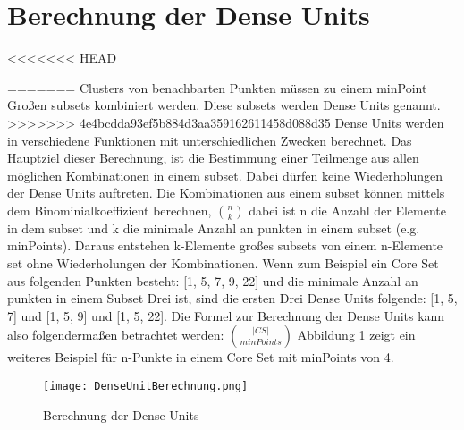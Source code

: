\section{Berechnung der Dense Units}
<<<<<<< HEAD
\label{sec:chap3}

=======
Clusters von benachbarten Punkten müssen zu einem minPoint Großen subsets kombiniert werden. Diese subsets werden Dense Units genannt.
>>>>>>> 4e4bcdda93ef5b884d3aa359162611458d088d35
Dense Units werden in verschiedene Funktionen mit unterschiedlichen Zwecken berechnet. Das Hauptziel dieser Berechnung, ist die Bestimmung einer Teilmenge aus allen möglichen Kombinationen in einem subset. Dabei dürfen keine Wiederholungen der Dense Units auftreten. Die Kombinationen aus einem subset können mittels dem Binominialkoeffizient berechnen, $ \binom{n}{k} $ dabei ist n die Anzahl der Elemente in dem subset und k die minimale Anzahl an punkten in einem subset (e.g. minPoints). Daraus entstehen k-Elemente großes subsets von einem n-Elemente set ohne Wiederholungen der Kombinationen.
Wenn zum Beispiel ein Core Set aus folgenden Punkten besteht: [1, 5, 7, 9, 22] und die minimale Anzahl an punkten in einem Subset Drei ist, sind die ersten Drei Dense Units folgende: [1, 5, 7] und [1, 5, 9] und [1, 5, 22]. Die Formel zur Berechnung der Dense Units kann also folgendermaßen betrachtet werden: 
$ \binom{|CS|}{minPoints}$ \cite{7022654} Abbildung \ref{dense-calculation} zeigt ein weiteres Beispiel für n-Punkte in einem Core Set mit minPoints von 4.

\begin{figure}
	\centering
	\texttt{[image: DenseUnitBerechnung.png]}
	\caption{Berechnung der Dense Units}
	\label{dense-calculation}
\end{figure}